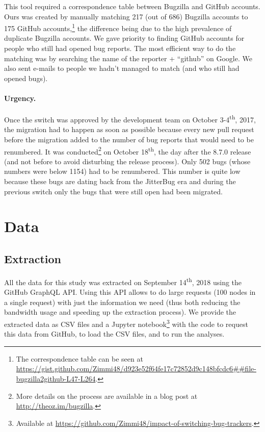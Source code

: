 \documentclass[runningheads]{llncs}
\begin{document}
This tool required a correspondence table between Bugzilla and GitHub accounts. Ours was created by manually matching 217 (out of 686) Bugzilla accounts to 175 GitHub accounts,\footnote{The correspondence table can be seen at \url{https://gist.github.com/Zimmi48/d923e52f64fe17c72852d9c148bfcdc6##file-bugzilla2github-L47-L264}.} the difference being due to the high prevalence of duplicate Bugzilla accounts. We gave priority to finding GitHub accounts for people who still had opened bug reports. The most efficient way to do the matching was by searching the name of the reporter + ``github'' on Google. We also sent e-mails to people we hadn't managed to match (and who still had opened bugs).

\paragraph{Urgency.}
Once the switch was approved by the development team on October 3-4\textsuperscript{th}, 2017, the migration had to happen as soon as possible because every new pull request before the migration added to the number of bug reports that would need to be renumbered. It was conducted\footnote{More details on the process are available in a blog post at \url{http://theoz.im/bugzilla}. } on October 18\textsuperscript{th},  the day after the 8.7.0 release (and not before to avoid disturbing the release process). Only 502 bugs (whose numbers were below 1154) had to be renumbered. This number is quite low because these bugs are dating back from the JitterBug era and during the previous switch only the bugs that were still open had been migrated.

\section{Data}

\subsection{Extraction}

All the data for this study was extracted on September 14\textsuperscript{th}, 2018 using the GitHub GraphQL API. Using this API allows to do large requests (100 nodes in a single request) with just the information we need (thus both reducing the bandwidth usage and speeding up the extraction process). We provide the extracted data as CSV files and a Jupyter notebook\footnote{Available at \url{https://github.com/Zimmi48/impact-of-switching-bug-trackers}.} with the code to request this data from GitHub, to load the CSV files, and to run the analyses.
\end{document}
